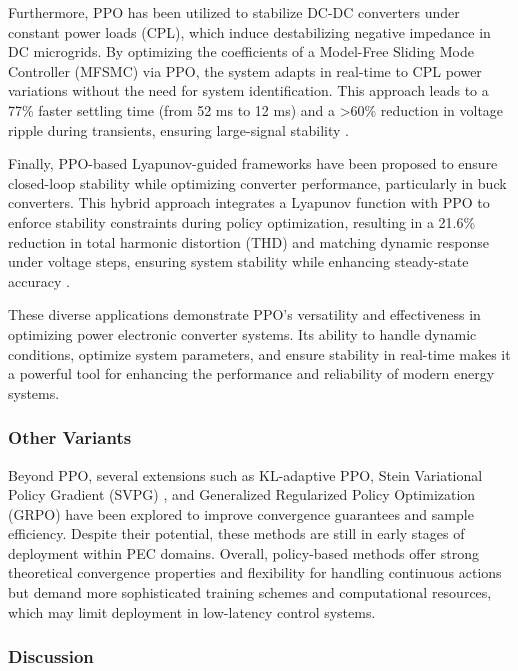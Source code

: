 Furthermore, PPO has been utilized to stabilize DC-DC converters under constant power loads (CPL), which induce destabilizing negative impedance in DC microgrids. By optimizing the coefficients of a Model-Free Sliding Mode Controller (MFSMC) via PPO, the system adapts in real-time to CPL power variations without the need for system identification. This approach leads to a 77\% faster settling time (from 52 ms to 12 ms) and a >60\% reduction in voltage ripple during transients, ensuring large-signal stability \cite{gheisarnejad2022reducing}.

Finally, PPO-based Lyapunov-guided frameworks have been proposed to ensure closed-loop stability while optimizing converter performance, particularly in buck converters. This hybrid approach integrates a Lyapunov function with PPO to enforce stability constraints during policy optimization, resulting in a 21.6\% reduction in total harmonic distortion (THD) and matching dynamic response under voltage steps, ensuring system stability while enhancing steady-state accuracy \cite{wan2025stability}.

These diverse applications demonstrate PPO's versatility and effectiveness in optimizing power electronic converter systems. Its ability to handle dynamic conditions, optimize system parameters, and ensure stability in real-time makes it a powerful tool for enhancing the performance and reliability of modern energy systems.

\subsubsection{Other Variants}       

Beyond PPO, several extensions such as KL-adaptive PPO, Stein Variational Policy Gradient (SVPG) \cite{liu2017stein}, and Generalized Regularized Policy Optimization (GRPO) \cite{shao2024deepseekmath} have been explored to improve convergence guarantees and sample efficiency. Despite their potential, these methods are still in early stages of deployment within PEC domains. Overall, policy-based methods offer strong theoretical convergence properties and flexibility for handling continuous actions but demand more sophisticated training schemes and computational resources, which may limit deployment in low-latency control systems.

\subsubsection{Discussion}

